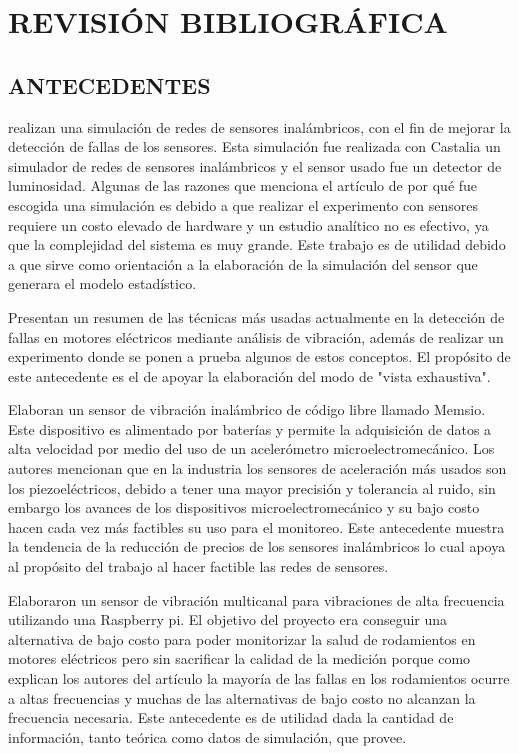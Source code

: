 \thispagestyle{empty}

\section{REVISIÓN BIBLIOGRÁFICA}

\subsection{ANTECEDENTES}

\textcite{Pinto} realizan una simulación de redes de sensores inalámbricos, con
el fin de mejorar la detección de fallas de los sensores. Esta simulación fue
realizada con Castalia un simulador de redes de sensores inalámbricos y el
sensor usado fue un detector de luminosidad. Algunas de las razones que
menciona el artículo de por qué fue escogida una simulación es debido a que
realizar el experimento con sensores requiere un costo elevado de hardware y un
estudio analítico no es efectivo, ya que la complejidad del sistema es muy
grande. Este trabajo es de utilidad debido a que sirve como orientación a la
elaboración de la simulación del sensor que generara el modelo estadístico.

\textcite{Ugwiri} Presentan un resumen de las técnicas más usadas actualmente
en la detección de fallas en motores eléctricos mediante análisis de vibración,
además de realizar un experimento donde se ponen a prueba algunos de estos
conceptos. El propósito de este antecedente es el de apoyar la elaboración del
modo de "vista exhaustiva".

\textcite{Koene} Elaboran un sensor de vibración inalámbrico de código libre
llamado Memsio. Este dispositivo es alimentado por baterías y permite la
adquisición de datos a alta velocidad por medio del uso de un acelerómetro
microelectromecánico. Los autores mencionan que en la industria los sensores de
aceleración más usados son los piezoeléctricos, debido a tener una mayor
precisión y tolerancia al ruido, sin embargo los avances de los dispositivos
microelectromecánico y su bajo costo hacen cada vez más factibles su uso para
el monitoreo. Este antecedente muestra la tendencia de la reducción de precios
de los sensores inalámbricos lo cual apoya al propósito del trabajo al hacer
factible las redes de sensores.

\textcite{Soto-Ocampo} Elaboraron un sensor de vibración multicanal para
vibraciones de alta frecuencia utilizando una Raspberry pi. El objetivo del
proyecto era conseguir una alternativa de bajo costo para poder monitorizar
la salud de rodamientos en motores eléctricos pero sin sacrificar la calidad de
la medición porque como explican los autores del artículo la mayoría de las
fallas en los rodamientos ocurre a altas frecuencias y muchas de las
alternativas de bajo costo no alcanzan la frecuencia necesaria. Este antecedente
es de utilidad dada la cantidad de información, tanto teórica como datos de
simulación, que provee.

